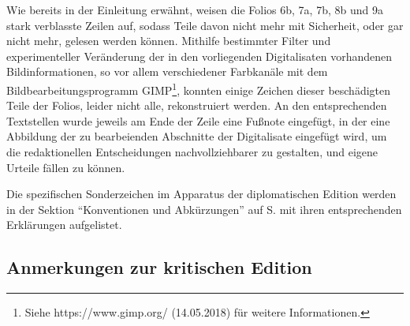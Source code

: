 \documentclass[a4paper,12pt]{article}
\begin{document}
{Wie bereits in der Einleitung erwähnt, weisen die Folios 6b, 7a, 7b, 8b und 9a stark verblasste Zeilen auf, sodass Teile davon nicht mehr mit Sicherheit, oder gar nicht mehr, gelesen werden können. Mithilfe bestimmter Filter und experimenteller Veränderung der in den vorliegenden Digitalisaten vorhandenen Bildinformationen, so vor allem verschiedener Farbkanäle mit dem Bildbearbeitungsprogramm GIMP\footnote{Siehe https://www.gimp.org/ (14.05.2018) für weitere Informationen.}, konnten einige Zeichen dieser beschädigten Teile der Folios, leider nicht alle, rekonstruiert werden. An den entsprechenden Textstellen wurde jeweils am Ende der Zeile eine Fußnote eingefügt, in der eine Abbildung der zu bearbeienden Abschnitte der Digitalisate eingefügt wird, um die redaktionellen Entscheidungen nachvollziehbarer zu gestalten, und eigene Urteile fällen zu können. 

Die spezifischen Sonderzeichen im Apparatus der diplomatischen Edition werden in der Sektion ``Konventionen und Abkürzungen'' auf S.\pageref{konv} mit ihren entsprechenden Erklärungen aufgelistet.   

\subsection{Anmerkungen zur kritischen Edition}


}
\end{document}
